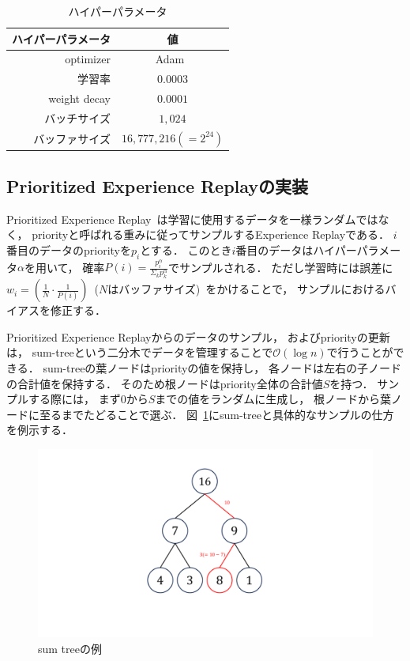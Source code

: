 \begin{table}[t]
\caption{ハイパーパラメータ}
\label{table:hyperparametr}
\centering
\begin{tabular}{r|c}
    \hline \hline
    ハイパーパラメータ & 値 \\ \hline
    optimizer & Adam~\cite{Adam} \\
    学習率 & $0.0003$ \\
    weight decay & $0.0001$ \\
    バッチサイズ & $1,024$ \\
    バッファサイズ & $16,777,216(=2^{24})$ \\
    \hline
\end{tabular}
\end{table}

\subsection{Prioritized Experience Replayの実装}
Prioritized Experience Replay~\cite{prioritized}は学習に使用するデータを一様ランダムではなく， priorityと呼ばれる重みに従ってサンプルするExperience Replayである．
$i$番目のデータのpriorityを$p_i$とする．
このとき$i$番目のデータはハイパーパラメータ$\alpha$を用いて， 確率$P(i) = \frac{p_{i}^{\alpha}}{\Sigma_k p_{k}^{\alpha}}$でサンプルされる．
ただし学習時には誤差に$w_i = (\frac{1}{N}\cdot \frac{1}{P(i)})$~($N$はバッファサイズ)~をかけることで， サンプルにおけるバイアスを修正する．

Prioritized Experience Replayからのデータのサンプル， およびpriorityの更新は， sum-treeという二分木でデータを管理することで$\mathcal{O}(\log n)$で行うことができる．
sum-treeの葉ノードはpriorityの値を保持し， 各ノードは左右の子ノードの合計値を保持する．
そのため根ノードはpriority全体の合計値$S$を持つ．
サンプルする際には， まず$0$から$S$までの値をランダムに生成し， 根ノードから葉ノードに至るまでたどることで選ぶ．
図~\ref{fig:sumtree}にsum-treeと具体的なサンプルの仕方を例示する．
\begin{figure}[t]
    \centering
    \includegraphics[width=0.4\linewidth{}]{figures/sumtree_.pdf}
    \caption{sum treeの例}
    \label{fig:sumtree}
\end{figure}

